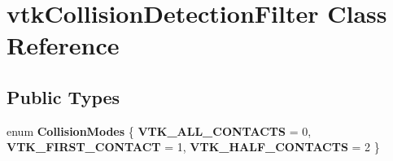 \hypertarget{classvtkCollisionDetectionFilter}{
\section{vtkCollisionDetectionFilter Class Reference}
\label{classvtkCollisionDetectionFilter}
}
\subsection*{Public Types}
\begin{DoxyCompactItemize}
\item 
enum {\bfseries CollisionModes} \{ {\bfseries VTK\_\-ALL\_\-CONTACTS} =  0, 
{\bfseries VTK\_\-FIRST\_\-CONTACT} =  1, 
{\bfseries VTK\_\-HALF\_\-CONTACTS} =  2
 \}
\end{DoxyCompactItemize}
